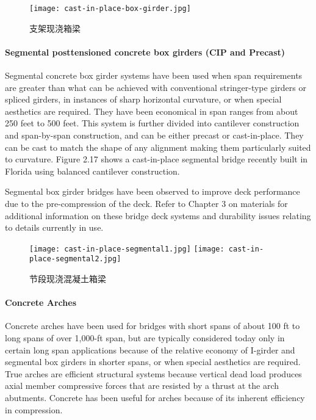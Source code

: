 \begin{figure}
  \texttt{[image: cast-in-place-box-girder.jpg]}
  \caption{支架现浇箱梁}
  \label{fig:cast-in-place-box-girder}
\end{figure}

\paragraph{Segmental posttensioned concrete box girders (CIP and Precast)}

Segmental concrete box girder systems have been used when span requirements are greater than what can be
achieved with conventional stringer-type girders or spliced girders, in instances of sharp horizontal curvature, or
when special aesthetics are required. They have been economical in span ranges from about 250 feet to 500 feet.
This system is further divided into cantilever construction and span-by-span construction, and can be either precast or
cast-in-place. They can be cast to match the shape of any alignment making them particularly suited to curvature.
Figure 2.17 shows a cast-in-place segmental bridge recently built in Florida using balanced cantilever construction.

Segmental box girder bridges have been observed to improve deck performance due to the pre-compression of
the deck. Refer to Chapter 3 on materials for additional information on these bridge deck systems and durability
issues relating to details currently in use.

\begin{figure}
  \texttt{[image: cast-in-place-segmental1.jpg]}\hfill
  \texttt{[image: cast-in-place-segmental2.jpg]}
  \caption{节段现浇混凝土箱梁}
  \label{fig:cast-in-place-segmental}
\end{figure}

\paragraph{Concrete Arches}

Concrete arches have been used for bridges with short spans of about 100 ft to long spans of over 1,000-ft span,
but are typically considered today only in certain long span applications because of the relative economy of I-girder
and segmental box girders in shorter spans, or when special aesthetics are required. True arches are efficient
structural systems because vertical dead load produces axial member compressive forces that are resisted by a thrust
at the arch abutments. Concrete has been useful for arches because of its inherent efficiency in compression.


